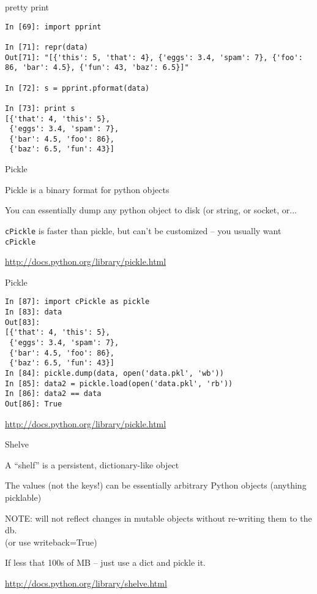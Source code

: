 \documentclass{beamer}
\begin{document}
\begin{frame}[fragile]{pretty print}

{\small
\begin{verbatim}
In [69]: import pprint

In [71]: repr(data)
Out[71]: "[{'this': 5, 'that': 4}, {'eggs': 3.4, 'spam': 7}, {'foo': 86, 'bar': 4.5}, {'fun': 43, 'baz': 6.5}]"

In [72]: s = pprint.pformat(data)

In [73]: print s
[{'that': 4, 'this': 5},
 {'eggs': 3.4, 'spam': 7},
 {'bar': 4.5, 'foo': 86},
 {'baz': 6.5, 'fun': 43}]
\end{verbatim}
}
\end{frame} 

\begin{frame}[fragile]{Pickle}

\vfill
{\Large Pickle is a binary format for python objects}

\vfill
{\Large You can essentially dump any python object to disk (or string, or socket, or...}

\vfill
{\Large \verb|cPickle| is faster than pickle, but
can't be customized -- you usually want \verb|cPickle|} 

\vfill
\url{http://docs.python.org/library/pickle.html}
\end{frame} 


\begin{frame}[fragile]{Pickle}

{\small
\begin{verbatim}
In [87]: import cPickle as pickle
In [83]: data
Out[83]: 
[{'that': 4, 'this': 5},
 {'eggs': 3.4, 'spam': 7},
 {'bar': 4.5, 'foo': 86},
 {'baz': 6.5, 'fun': 43}]
In [84]: pickle.dump(data, open('data.pkl', 'wb'))
In [85]: data2 = pickle.load(open('data.pkl', 'rb'))
In [86]: data2 == data
Out[86]: True
\end{verbatim}
}

\vfill
\url{http://docs.python.org/library/pickle.html}
\end{frame} 

\begin{frame}[fragile]{Shelve}

\vfill
{\Large A ``shelf'' is a persistent, dictionary-like object}

\vfill
{\Large The values (not the keys!) can be essentially arbitrary Python
objects (anything picklable)}

\vfill
{\Large NOTE: will not reflect changes in mutable objects without
   re-writing them to the db.}\\
   (or use writeback=True)

\vfill
{\Large If less that 100s of MB -- just use a dict and pickle it.}

\vfill
\url{http://docs.python.org/library/shelve.html}
\end{frame} 
\end{document}
